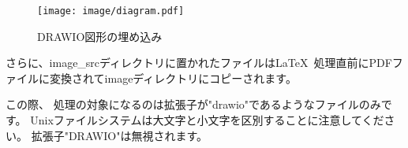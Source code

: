 \begin{wrapfigure}[10]{O}[0pt]{0\textwidth}
  \texttt{[image: image/diagram.pdf]}
  \caption{DRAWIO図形の埋め込み}\label{embeded_drawio}
\end{wrapfigure}

さらに、image\_srcディレクトリに置かれたファイルは\LaTeX\
処理直前にPDFファイルに変換されてimageディレクトリにコピーされます。

この際、
処理の対象になるのは拡張子が"drawio"であるようなファイルのみです。
Unixファイルシステムは大文字と小文字を区別することに注意してください。
拡張子"DRAWIO"は無視されます。

